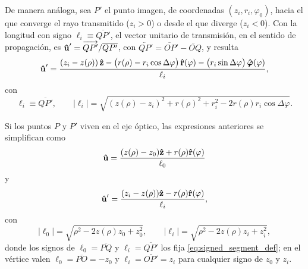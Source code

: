 De manera análoga, sea $P'$ el punto imagen, de coordenadas $(z_i, r_i, \varphi_0)$, hacia el que converge el rayo transmitido ($z_i>0$) o desde el que diverge ($z_i<0$). Con la longitud con signo $\ell_i\equiv\overline{QP'}$, el vector unitario de transmisión, en el sentido de propagación, es $\bm{\hat{\mathbf{u}}}'=\overrightarrow{QP'}/\overline{QP'}$, con $\lvec{QP'} = \lvec{OP'} - \lvec{OQ}$, y resulta
\begin{equation}
   \bm{\hat{\mathbf{u}}}'
  =
  \frac{
  (z_i - z(\rho))\,\bm{\hat{\mathbf{z}}}
  - \bigl(r(\rho) - r_i \cos\Delta\varphi\bigr)\,\bm{\hat{\mathbf{r}}}(\varphi)
  - \bigl(r_i \sin\Delta\varphi\bigr)\,\bm{\hat{\mathbf{\varphi}}}(\varphi)
  }{
  \ell_i
  },
  \label{eq:u_prime_for_any_P}
\end{equation}
con
\begin{equation*}
  \ell_i\equiv\overline{QP'},\qquad |\ell_i|=\sqrt{(z(\rho) - z_i)^2 + r(\rho)^2 + r_i^2 - 2 r(\rho) r_i \cos\Delta\varphi}.
\end{equation*}

Si los puntos $P$ y $P'$ viven en el eje óptico, las expresiones anteriores se simplifican como
\begin{equation}
  \bm{\hat{\mathbf{u}}} = \frac{(z(\rho) - z_0)\bm{\hat{\mathbf{z}}} + r(\rho)\bm{\hat{\mathbf{r}}}(\varphi)}{\ell_0}
  \label{eq:u_for_P_in_optical_axis}
\end{equation}
y
\begin{equation}
  \bm{\hat{\mathbf{u}}}' = \frac{(z_i - z(\rho))\bm{\hat{\mathbf{z}}} - r(\rho)\bm{\hat{\mathbf{r}}}(\varphi)}{\ell_i},
  \label{eq:u_prime_for_P_in_optical_axis}
\end{equation}
con
\begin{equation}
  |\ell_0|=\sqrt{\rho^2 - 2z(\rho)z_0 + z_0^2},
  \qquad
  |\ell_i|=\sqrt{\rho^2 - 2z(\rho)z_i + z_i^2},
  \label{eq:signed_lengths_axis}
\end{equation}
donde los signos de $\ell_0=\overline{PQ}$ y $\ell_i=\overline{QP'}$ los fija \eqref{eq:signed_segment_def}; en el vértice valen $\ell_0=\overline{PO}=-z_0$ y $\ell_i=\overline{OP'}=z_i$ para cualquier signo de $z_0$ y $z_i$.

